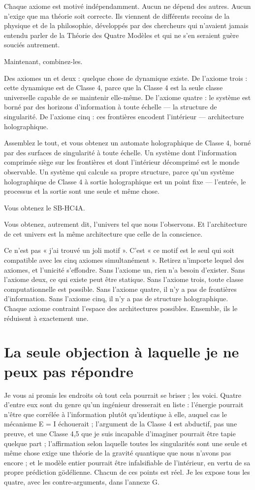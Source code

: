 \documentclass[11pt, twoside, openright]{book}
\begin{document}
Chaque axiome est motivé indépendamment. Aucun ne dépend des autres. Aucun n'exige que ma théorie soit correcte. Ils viennent de différents recoins de la physique et de la philosophie, développés par des chercheurs qui n'avaient jamais entendu parler de la Théorie des Quatre Modèles et qui ne s'en seraient guère souciés autrement.

Maintenant, combinez-les.

Des axiomes un et deux : quelque chose de dynamique existe. De l'axiome trois : cette dynamique est de Classe 4, parce que la Classe 4 est la seule classe universelle capable de se maintenir elle-même. De l'axiome quatre : le système est borné par des horizons d'information à toute échelle --- la structure de singularité. De l'axiome cinq : ces frontières encodent l'intérieur --- architecture holographique.

Assemblez le tout, et vous obtenez un automate holographique de Classe 4, borné par des surfaces de singularité à toute échelle. Un système dont l'information comprimée siège sur les frontières et dont l'intérieur décomprimé est le monde observable. Un système qui calcule sa propre structure, parce qu'un système holographique de Classe 4 à sortie holographique est un point fixe --- l'entrée, le processus et la sortie sont une seule et même chose.

Vous obtenez le SB-HC4A.

Vous obtenez, autrement dit, l'univers tel que nous l'observons. Et l'architecture de cet univers est la même architecture que celle de la conscience.

Ce n'est pas « j'ai trouvé un joli motif ». C'est « ce motif est le seul qui soit compatible avec les cinq axiomes simultanément ». Retirez n'importe lequel des axiomes, et l'unicité s'effondre. Sans l'axiome un, rien n'a besoin d'exister. Sans l'axiome deux, ce qui existe peut être statique. Sans l'axiome trois, toute classe computationnelle est possible. Sans l'axiome quatre, il n'y a pas de frontières d'information. Sans l'axiome cinq, il n'y a pas de structure holographique. Chaque axiome contraint l'espace des architectures possibles. Ensemble, ils le réduisent à exactement une.

\section*{La seule objection à laquelle je ne peux pas répondre}

Je vous ai promis les endroits où tout cela pourrait se briser ; les voici. Quatre d'entre eux sont du genre qu'un ingénieur dresserait en liste : l'énergie pourrait n'être que corrélée à l'information plutôt qu'identique à elle, auquel cas le mécanisme E = I échouerait ; l'argument de la Classe 4 est abductif, pas une preuve, et une Classe 4,5 que je suis incapable d'imaginer pourrait être tapie quelque part ; l'affirmation selon laquelle toutes les singularités sont une seule et même chose exige une théorie de la gravité quantique que nous n'avons pas encore ; et le modèle entier pourrait être infalsifiable de l'intérieur, en vertu de sa propre prédiction gödélienne. Chacun de ces points est réel. Je les expose tous les quatre, avec les contre-arguments, dans l'annexe G.
\end{document}
